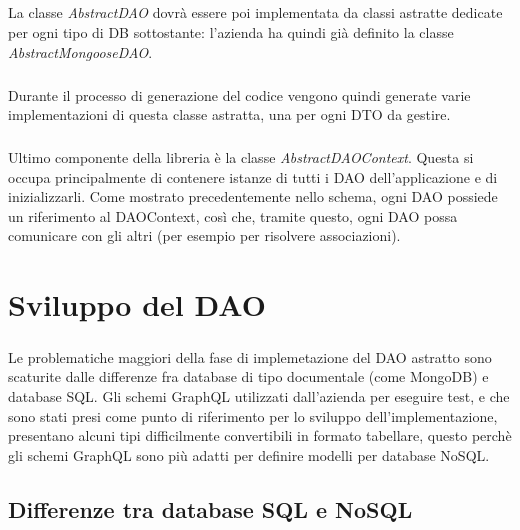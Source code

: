 \documentclass[a4paper, 12pt]{report}
\begin{document}
    \paragraph*{}
    La classe \emph{AbstractDAO} dovrà essere poi implementata da classi astratte dedicate per ogni tipo di DB sottostante: l'azienda ha quindi già definito la classe \emph{AbstractMongooseDAO}.
    \paragraph*{}
    Durante il processo di generazione del codice vengono quindi generate varie implementazioni di questa classe astratta, una per ogni DTO da gestire.
    \paragraph*{}
    Ultimo componente della libreria è la classe \emph{AbstractDAOContext}. Questa si occupa principalmente di contenere istanze di tutti i DAO dell'applicazione e di inizializzarli.
    Come mostrato precedentemente nello schema, ogni DAO possiede un riferimento al DAOContext, così che, tramite questo, ogni DAO possa comunicare con gli altri (per esempio per risolvere associazioni).
  \newpage
  \chapter{Sviluppo del DAO}
    \paragraph*{}
    Le problematiche maggiori della fase di implemetazione del DAO astratto sono scaturite dalle differenze fra database di tipo documentale (come MongoDB) e database SQL.
    Gli schemi GraphQL utilizzati dall'azienda per eseguire test, e che sono stati presi come punto di riferimento per lo sviluppo dell'implementazione, presentano alcuni tipi difficilmente convertibili in formato tabellare, questo perchè gli schemi GraphQL sono
    più adatti per definire modelli per database NoSQL.
    \section{Differenze tra database SQL e NoSQL}
\end{document}
